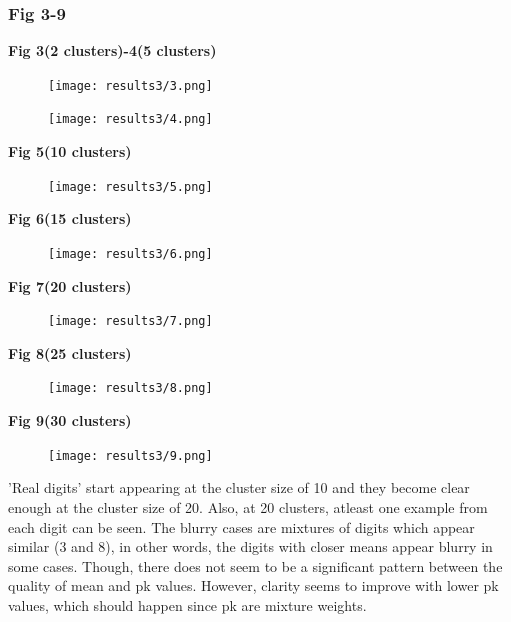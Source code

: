 \documentclass{article}
\begin{document}
\subsubsection{Fig 3-9}
\textbf{Fig 3(2 clusters)-4(5 clusters) }
\begin{figure}[h!]
\centering
\begin{multicols}{2}
\texttt{[image: results3/3.png]}
\label{3}

\texttt{[image: results3/4.png]}
\label{4}
\end{multicols}
\end{figure}
\newpage
\textbf{Fig 5(10 clusters)}
\begin{figure}[h!]
\centering
\texttt{[image: results3/5.png]}
\label{5}
\end{figure}
\newline
\textbf{Fig 6(15 clusters)}
\begin{figure}[h!]
\centering
\texttt{[image: results3/6.png]}
\label{6}
\end{figure}
\newline
\textbf{Fig 7(20 clusters)}
\begin{figure}[h!]
\centering
\texttt{[image: results3/7.png]}
\label{7}
\end{figure}
\newpage
\textbf{Fig 8(25 clusters)}
\begin{figure}[h!]
\centering
\texttt{[image: results3/8.png]}
\label{8}
\end{figure}
\newline
\textbf{Fig 9(30 clusters)}
\begin{figure}[h!]
\centering
\texttt{[image: results3/9.png]}
\label{9}
\end{figure}

'Real digits' start appearing at the cluster size of 10 and they become clear enough at the cluster size of 20. Also, at 20 clusters, atleast one example from each digit can be seen. The blurry cases are mixtures of digits which appear similar (3 and 8), in other words, the digits with closer means appear blurry in some cases. Though, there does not seem to be a significant pattern between the quality of mean and pk values. However, clarity seems to improve with lower pk values, which should happen since pk are mixture weights.
\end{document}
